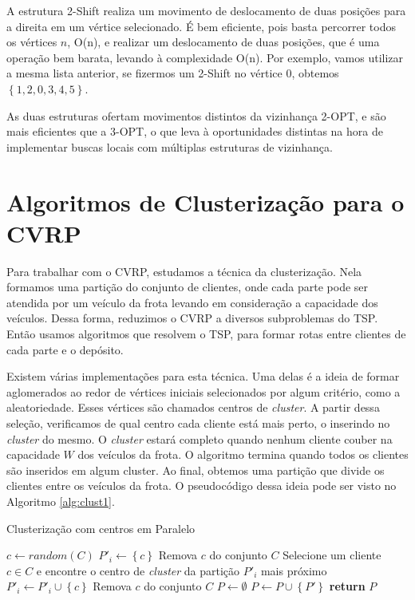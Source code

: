 \documentclass[12pt, a4paper]{article}
\begin{document}
A estrutura 2-Shift realiza um movimento de deslocamento de duas posições para a direita em um vértice selecionado. É bem eficiente, pois basta percorrer todos os vértices $n$, O(n), e realizar um deslocamento de duas posições, que é uma operação bem barata, levando à complexidade O(n). Por exemplo, vamos utilizar a mesma lista anterior, se fizermos um 2-Shift no vértice 0, obtemos $\left\{1, 2, 0, 3, 4, 5\right\}$. 

As duas estruturas ofertam movimentos distintos da vizinhança 2-OPT, e são mais eficientes que a 3-OPT, o que leva à oportunidades distintas na hora de implementar buscas locais com múltiplas estruturas de vizinhança.

\section{Algoritmos de Clusterização para o CVRP}\label{sec:algorithms_VRP}

Para trabalhar com o CVRP, estudamos a técnica da clusterização. Nela formamos uma partição do conjunto de clientes, onde cada parte pode ser atendida por um veículo da frota levando em consideração a capacidade dos veículos. Dessa forma, reduzimos o CVRP a diversos subproblemas do TSP. Então usamos algoritmos que resolvem o TSP, para formar rotas entre clientes de cada parte e o depósito. 

Existem várias implementações para esta técnica. Uma delas é a ideia de formar aglomerados ao redor de vértices iniciais selecionados por algum critério, como a aleatoriedade. Esses vértices são chamados centros de \textit{cluster}. A partir dessa seleção, verificamos de qual centro cada cliente está mais perto, o inserindo no \textit{cluster} do mesmo. O \textit{cluster} estará completo quando nenhum cliente couber na capacidade $W$ dos veículos da frota. O algoritmo termina quando todos os clientes são inseridos em algum cluster. Ao final, obtemos uma partição que divide os clientes entre os veículos da frota. O pseudocódigo dessa ideia pode ser visto no Algoritmo \ref{alg:clust1}.
%
\begin{algorithm}[htb!]
  \caption{Clusterização com centros em Paralelo}\label{alg:clust1}
  \begin{algorithmic}[1]
	\State $c \gets random(C)$
	\State $P'_i \gets \left\{c\right\}$
	\State Remova $c$ do conjunto $C$
      \EndFor
       	\State Selecione um cliente $c \in C$ e encontre o centro de \textit{cluster} da partição $P'_i$ mais próximo
        	 \State $P'_i\gets P'_i \cup \left\{c\right\}$
	 \State Remova $c$ do conjunto $C$
       \EndWhile
        \State $P \gets \emptyset$
	\State $P\gets P \cup \left\{P'\right\}$
       \EndFor
      \State \textbf{return} $P$
    \EndFunction
  \end{algorithmic}
\end{algorithm}
\end{document}
